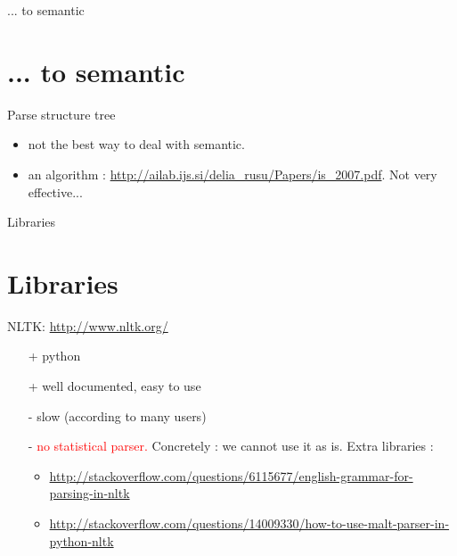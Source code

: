 \documentclass[10pt]{beamer}
\begin{document}
\begin{frame}{... to semantic}

\section{... to semantic}

Parse structure tree 
\begin{itemize}
	\item not the best way to deal with semantic.
	\item an algorithm : \url{http://ailab.ijs.si/delia_rusu/Papers/is_2007.pdf}. Not very effective...
\end{itemize}


		
\end{frame}


\begin{frame}{Libraries}

\section{Libraries}

\begin{exampleblock}{NLTK: \url{http://www.nltk.org/}}
	\begin{itemize}
		\item[+] python
		\item[+] well documented, easy to use
		\item[-] slow (according to many users)
		\item[-] \textcolor{red}{no statistical parser.} Concretely : we cannot use it as is. Extra libraries : 
				\begin{itemize}
					\item \url{http://stackoverflow.com/questions/6115677/english-grammar-for-parsing-in-nltk}
					\item \url{http://stackoverflow.com/questions/14009330/how-to-use-malt-parser-in-python-nltk}
				\end{itemize}
	\end{itemize}
\end{exampleblock}

\end{frame}
\end{document}
